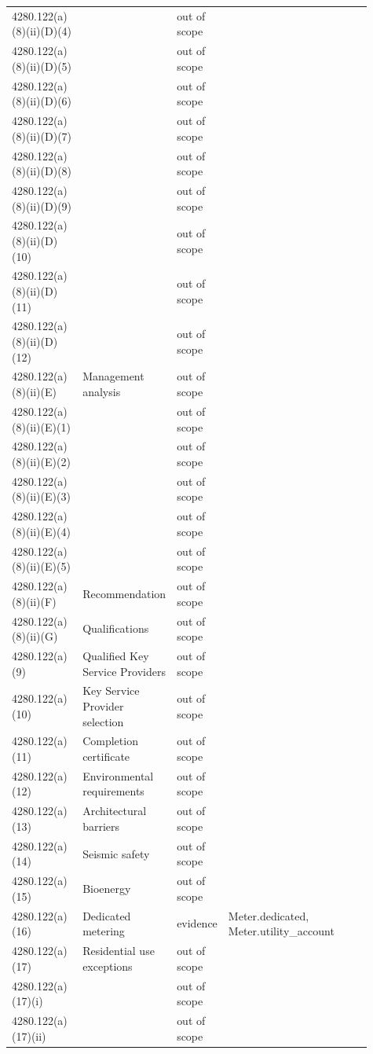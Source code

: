 \begin{longtable}{p{0.2\linewidth}p{0.2\linewidth}p{0.09\linewidth}p{0.42\linewidth}}
4280.122(a)(8)(ii)(D)(4) &  & out of scope &  \\
4280.122(a)(8)(ii)(D)(5) &  & out of scope &  \\
4280.122(a)(8)(ii)(D)(6) &  & out of scope &  \\
4280.122(a)(8)(ii)(D)(7) &  & out of scope &  \\
4280.122(a)(8)(ii)(D)(8) &  & out of scope &  \\
4280.122(a)(8)(ii)(D)(9) &  & out of scope &  \\
4280.122(a)(8)(ii)(D)(10) &  & out of scope &  \\
4280.122(a)(8)(ii)(D)(11) &  & out of scope &  \\
4280.122(a)(8)(ii)(D)(12) &  & out of scope &  \\
4280.122(a)(8)(ii)(E) & Management analysis & out of scope &  \\
4280.122(a)(8)(ii)(E)(1) &  & out of scope &  \\
4280.122(a)(8)(ii)(E)(2) &  & out of scope &  \\
4280.122(a)(8)(ii)(E)(3) &  & out of scope &  \\
4280.122(a)(8)(ii)(E)(4) &  & out of scope &  \\
4280.122(a)(8)(ii)(E)(5) &  & out of scope &  \\
4280.122(a)(8)(ii)(F) & Recommendation & out of scope &  \\
4280.122(a)(8)(ii)(G) & Qualifications & out of scope &  \\
4280.122(a)(9) & Qualified Key Service Providers & out of scope &  \\
4280.122(a)(10) & Key Service Provider selection & out of scope &  \\
4280.122(a)(11) & Completion certificate & out of scope &  \\
4280.122(a)(12) & Environmental requirements & out of scope &  \\
4280.122(a)(13) & Architectural barriers & out of scope &  \\
4280.122(a)(14) & Seismic safety & out of scope &  \\
4280.122(a)(15) & Bioenergy & out of scope &  \\
4280.122(a)(16) & Dedicated metering & evidence & Meter.dedicated, Meter.utility\_account \\
4280.122(a)(17) & Residential use exceptions & out of scope &  \\
4280.122(a)(17)(i) &  & out of scope &  \\
4280.122(a)(17)(ii) &  & out of scope &  \\

\end{longtable}
